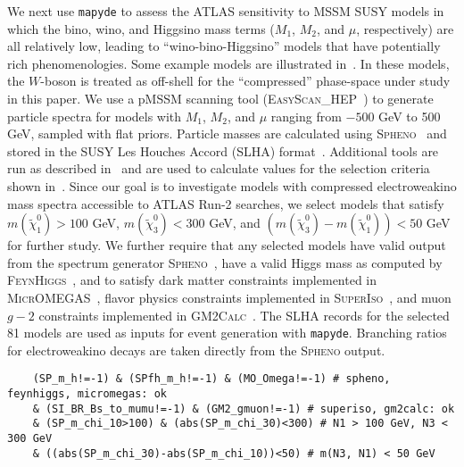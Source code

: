 \documentclass{article}
\newcommand{\chioz}{\ensuremath{\widetilde{\chi}_{1}^{0}}}
\newcommand{\chithz}{\ensuremath{\widetilde{\chi}_{3}^{0}}}
\newcommand{\mapyde}{\texttt{mapyde}}
\newcommand{\easyscanhep}{\textsc{EasyScan\_HEP}}
\newcommand{\spheno}{\textsc{Spheno}}
\newcommand{\feynhiggs}{\textsc{FeynHiggs}}
\newcommand{\micromegas}{\textsc{MicrOMEGAS}}
\newcommand{\superiso}{\textsc{SuperIso}}
\newcommand{\gmtwocalc}{\textsc{GM2Calc}}
\begin{document}
We next use \mapyde{} to assess the ATLAS sensitivity to MSSM SUSY models in which the bino, wino, and Higgsino mass terms ($M_1$, $M_2$, and $\mu$, respectively) are all relatively low, leading to \enquote{wino-bino-Higgsino} models that have potentially rich phenomenologies. Some example models are illustrated in~.  In these models, the $W$-boson is treated as off-shell for the \enquote{compressed} phase-space under study in this paper.  We use a pMSSM scanning tool (\easyscanhep~\cite{Shang:2023gfy,Han:2016gvr}) to generate particle spectra for models with $M_1$, $M_2$, and $\mu$ ranging from $-500$ GeV to 500 GeV, sampled with flat priors.
Particle masses are calculated using \spheno~\cite{Porod:2003um,Porod:2011nf} and stored in the SUSY Les Houches Accord (SLHA) format~\cite{Allanach:2008qq}.  Additional tools are run as described in~ and are used to calculate values for the selection criteria shown in~.  Since our goal is to investigate models with compressed electroweakino mass spectra accessible to ATLAS Run-2 searches, we select models that satisfy $m(\chioz) > 100$ GeV, $m(\chithz)<300$ GeV, and $(m(\chithz)-m(\chioz))<50$ GeV for further study.  We further require that any selected models have valid output from the spectrum generator \spheno~\cite{Porod:2003um,Porod:2011nf}, have a valid Higgs mass as computed by \feynhiggs~\cite{Bahl:2018qog,Bahl:2017aev,Bahl:2016brp,Hahn:2013ria,Frank:2006yh,Degrassi:2002fi,Heinemeyer:1998np,Heinemeyer:1998yj}, and to satisfy dark matter constraints implemented in \micromegas~\cite{Belanger:2020gnr}, flavor physics constraints implemented in \superiso~\cite{Arbey:2018msw}, and muon $g-2$ constraints implemented in \gmtwocalc~\cite{Athron:2015rva,Athron:2021evk}.  The SLHA records for the selected 81 models are used as inputs for event generation with \mapyde.  Branching ratios for electroweakino decays are taken directly from the \spheno{} output.

\begin{listing}[H]
	\begin{verbatim}
    (SP_m_h!=-1) & (SPfh_m_h!=-1) & (MO_Omega!=-1) # spheno, feynhiggs, micromegas: ok
    & (SI_BR_Bs_to_mumu!=-1) & (GM2_gmuon!=-1) # superiso, gm2calc: ok
    & (SP_m_chi_10>100) & (abs(SP_m_chi_30)<300) # N1 > 100 GeV, N3 < 300 GeV
    & ((abs(SP_m_chi_30)-abs(SP_m_chi_10))<50) # m(N3, N1) < 50 GeV
  \end{verbatim}
	\caption{The mask used to define the selection of models for assessing the ATLAS sensitivity to Higgsino-Win
		We next use \mapyde{} to assess the ATLAS sensitivity to MSSM SUSY models in which the bino, wino, and Higgsino o models.}
	\label{lst:mask}
\end{listing}
\end{document}
